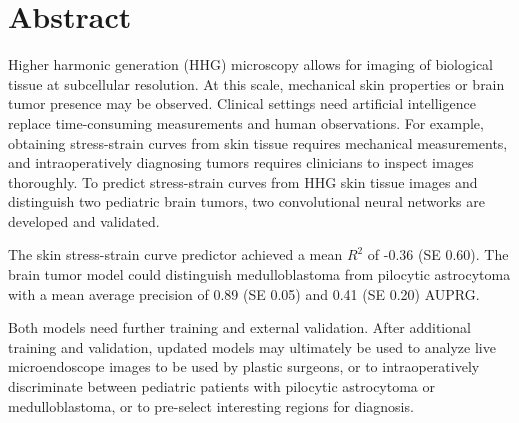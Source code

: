 \section*{Abstract}
Higher harmonic generation (HHG) microscopy allows for imaging of biological tissue at subcellular resolution.
At this scale, mechanical skin properties or brain tumor presence may be observed.
Clinical settings need artificial intelligence replace time-consuming measurements and human observations.
For example, obtaining stress-strain curves from skin tissue requires mechanical measurements, and intraoperatively diagnosing tumors requires clinicians to inspect images thoroughly.
To predict stress-strain curves from HHG skin tissue images and distinguish two pediatric brain tumors, two convolutional neural networks are developed and validated.

The skin stress-strain curve predictor achieved a mean $R^2$ of -0.36 (SE 0.60).
The brain tumor model could distinguish medulloblastoma from pilocytic astrocytoma with a mean average precision of 0.89 (SE 0.05) and 0.41 (SE 0.20) AUPRG.

Both models need further training and external validation.
After additional training and validation, updated models may ultimately be used to analyze live microendoscope images to be used by plastic surgeons, or to intraoperatively discriminate between pediatric patients with pilocytic astrocytoma or medulloblastoma, or to pre-select interesting regions for diagnosis.
